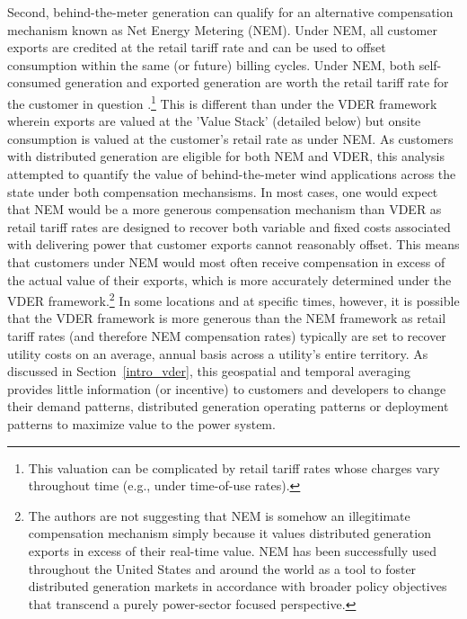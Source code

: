 Second, behind-the-meter generation can qualify for an alternative compensation mechanism known as Net Energy Metering (NEM). Under NEM, all customer exports are credited at the retail tariff rate and can be used to offset consumption within the same (or future) billing cycles. Under NEM, both self-consumed generation and exported generation are worth the retail tariff rate for the customer in question \cite{zinaman_grid-connected_2017}.\footnote{This valuation can be complicated by retail tariff rates whose charges vary throughout time (e.g., under time-of-use rates).} This is different than under the VDER framework wherein exports are valued at the 'Value Stack' (detailed below) but onsite consumption is valued at the customer's retail rate as under NEM. As customers with distributed generation are eligible for both NEM and VDER, this analysis attempted to quantify the value of behind-the-meter wind applications across the state under both compensation mechansisms. In most cases, one would expect that NEM would be a more generous compensation mechanism than VDER as retail tariff rates are designed to recover both variable and fixed costs associated with delivering power that customer exports cannot reasonably offset. This means that customers under NEM would most often receive compensation in excess of the actual value of their exports, which is more accurately determined under the VDER framework.\footnote{The authors are not suggesting that NEM is somehow an illegitimate compensation mechanism simply because it values distributed generation exports in excess of their real-time value. NEM has been successfully used throughout the United States and around the world as a tool to foster distributed generation markets in accordance with broader policy objectives that transcend a purely power-sector focused perspective.} In some locations and at specific times, however, it is possible that the VDER framework is more generous than the NEM framework as retail tariff rates (and therefore NEM compensation rates) typically are set to recover utility costs on an average, annual basis across a utility's entire territory. As discussed in Section~\ref{intro_vder}, this geospatial and temporal averaging provides little information (or incentive) to customers and developers to change their demand patterns, distributed generation operating patterns or deployment patterns to maximize value to the power system.


